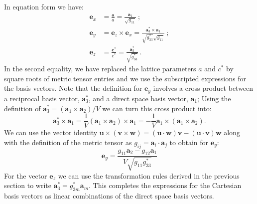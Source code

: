 In equation form we have:
\begin{equation}
\begin{split}
	\mathbf{e}_x &= \frac{\mathbf{a}}{a} = \frac{\mathbf{a}_1}{ \sqrt{g_{11}} }\ ;\\
	\mathbf{e}_y &= \mathbf{e}_z\times\mathbf{e}_x=\frac{\mathbf{a}^{\ast}_3\times\mathbf{a}_1}{\sqrt{g^{\ast}_{33}}\sqrt{g_{11}}}\ ;\\
	\mathbf{e}_z &= \frac{\mathbf{c^{\ast}}}{c^{\ast}}=\frac{\mathbf{a}^{\ast}_3}{\sqrt{g^{\ast}_{33}}}\ .	
\end{split}
\end{equation}
In the second equality, we have replaced the lattice parameters $a$ and $c^{\ast}$ by square roots of metric tensor entries and we use the subscripted expressions for the basis vectors.  Note that the definition for $\mathbf{e}_y$ involves a cross product between a reciprocal basis vector, $\mathbf{a}^{\ast}_3$, and a direct space basis vector, $\mathbf{a}_1$; Using the definition of $\mathbf{a}^{\ast}_3=(\mathbf{a}_1\times\mathbf{a}_2)/V$ we can turn this cross product into:
\[
	\mathbf{a}^{\ast}_3\times\mathbf{a}_1 = \frac{1}{V}(\mathbf{a}_1\times\mathbf{a}_2)\times \mathbf{a}_1=-\frac{1}{V}\mathbf{a}_1\times(\mathbf{a}_1\times\mathbf{a}_2).
\]
We can use the vector identity $\mathbf{u}\times(\mathbf{v}\times\mathbf{w})=(\mathbf{u}\cdot\mathbf{w})\mathbf{v}-(\mathbf{u}\cdot\mathbf{v})\mathbf{w}$ along with the definition of the metric tensor as $g_{ij}=\mathbf{a}_i\cdot\mathbf{a}_j$ to obtain for $\mathbf{e}_y$:
\[
	\mathbf{e}_y = \frac{g_{11}\mathbf{a}_2-g_{12}\mathbf{a}_1}{V\sqrt{g_{11}g^{\ast}_{33}}}
\]
For the vector $\mathbf{e}_z$ we can use the transformation rules derived in the previous section to write $\mathbf{a}^{\ast}_3=g^{\ast}_{3m}\mathbf{a}_m$.  This completes the expressions for the Cartesian basis vectors as linear combinations of the direct space basis vectors.

